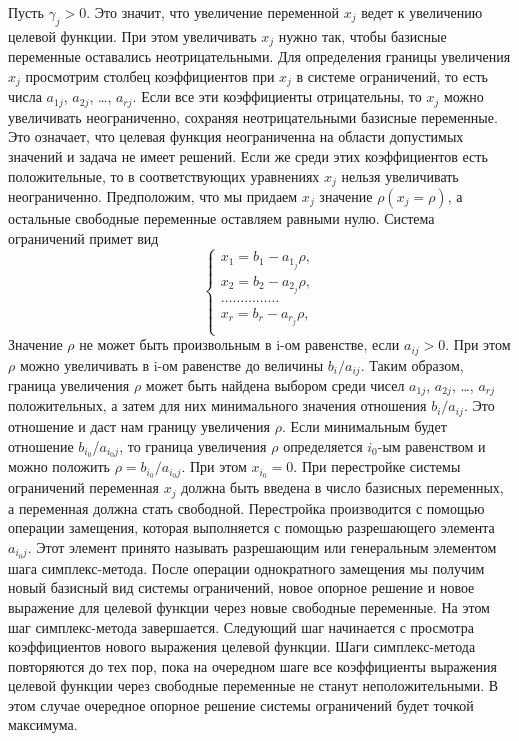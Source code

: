 \documentclass{article}
\begin{document}
Пусть $\gamma_j > 0$. Это значит, что увеличение переменной $x_j$ ведет к увеличению целевой функции. При этом увеличивать $x_j$ нужно так, чтобы базисные переменные оставались неотрицательными. Для определения границы увеличения $x_j$ просмотрим столбец коэффициентов при $x_j$ в системе ограничений, то есть числа
$a_{1j}$, $a_{2j}$, \dots, $a_{rj}$. Если все эти коэффициенты отрицательны, то $x_j$ можно увеличивать неограниченно, сохраняя неотрицательными базисные переменные. Это означает, что целевая функция неограниченна на области допустимых значений и задача не имеет решений. Если же среди этих коэффициентов есть положительные, то в соответствующих уравнениях $x_j$ нельзя увеличивать неограниченно. Предположим, что мы придаем $x_j$ значение $\rho  (x_j = \rho)$, а остальные свободные переменные оставляем равными нулю. Система ограничений примет вид
\begin{equation*}
\begin{cases}
x_1 = b_1 - a_{1_j}\rho,\\
x_2 = b_2 - a_{2_j}\rho,\\
\dots\dots\dots\dots\dots\\
x_r = b_r - a_{r_j}\rho,\\
\end{cases}
\end{equation*}
Значение $\rho$ не может быть произвольным в i-ом равенстве, если $a_{ij}>0$. При этом $\rho$ можно увеличивать в i-ом равенстве до величины $b_i/a_{ij}$. Таким образом, граница увеличения $\rho$ может быть найдена выбором среди чисел $a_{1j}$, $a_{2j}$, \dots, $a_{rj}$ положительных, а затем для них минимального значения отношения $b_i/a_{ij}$. Это отношение и даст нам границу увеличения $\rho$. Если минимальным будет отношение $b_{i_0}$/$a_{i_0j}$, то граница увеличения $\rho$ определяется $i_0$-ым равенством и можно положить $\rho = b_{i_0}/a_{i_0j}$. При этом $x_{i_0} = 0$.  При перестройке системы ограничений переменная $x_j$ должна быть введена в число базисных переменных, а переменная  должна стать свободной. Перестройка производится с помощью операции замещения, которая выполняется с помощью разрешающего элемента $a_{i_0j}$. Этот элемент принято называть разрешающим или генеральным элементом шага симплекс-метода. После операции однократного замещения мы получим новый базисный вид системы ограничений, новое опорное решение и новое выражение для целевой функции через новые свободные переменные. На этом шаг симплекс-метода завершается. Следующий шаг начинается с просмотра коэффициентов нового выражения целевой функции. Шаги симплекс-метода повторяются до тех пор, пока на очередном шаге все коэффициенты выражения целевой функции через свободные переменные не станут неположительными. В этом случае очередное опорное решение системы ограничений будет точкой максимума.
\end{document}
